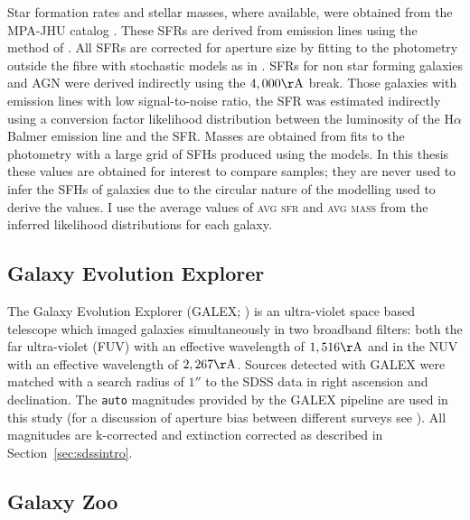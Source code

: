 Star formation rates and stellar masses, where available, were obtained from the MPA-JHU catalog \citep{kauffmann03, brinchmann04}. These SFRs are derived from emission lines using the method of \cite{charlot01}. All SFRs are corrected for aperture size by fitting to the photometry outside the fibre with stochastic models as in \cite{Salim07}. SFRs for non star forming galaxies and AGN were derived indirectly using the $4,000\rm{\AA}$ break. Those galaxies with emission lines with low signal-to-noise ratio, the SFR was estimated indirectly using a conversion factor likelihood distribution between the luminosity of the H$\alpha$ Balmer emission line and the SFR. Masses are obtained from fits to the photometry with a large grid of SFHs produced using the \cite{BC03} models. In this thesis these values are obtained for interest to compare samples; they are never used to infer the SFHs of galaxies due to the circular nature of the modelling used to derive the values. I use the average values of \textsc{avg sfr} and \textsc{avg mass} from the inferred likelihood distributions for each galaxy.

\subsection{Galaxy Evolution Explorer}\label{sec:galexintro}

The Galaxy Evolution Explorer (GALEX; \citealt{Martin05}) is an ultra-violet space based telescope which imaged galaxies simultaneously in two broadband filters: both the far ultra-violet (FUV) with an effective wavelength of $1,516\rm{\AA}$ and in the NUV with an effective wavelength of $2,267\rm{\AA}$. Sources detected with GALEX were matched with a search radius of $1''$ to the SDSS data in right ascension and declination. The {\tt auto} magnitudes provided by the GALEX pipeline are used in this study (for a discussion of aperture bias between different surveys see \citealt{hill11}). All magnitudes are k-corrected and extinction corrected as described in Section~\ref{sec:sdssintro}.

\subsection{Galaxy Zoo}\label{sec:GZ}

